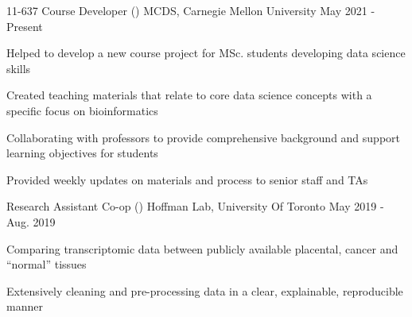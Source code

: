 \begin{cventries}
    \cventry
    {11-637 Course Developer ()}
      {MCDS, Carnegie Mellon University}
      {May 2021 - Present}
      {}%
      {
        \begin{cvitems}
        \item {Helped to develop a new course project for MSc. students developing data science skills}
        \item {Created teaching materials that relate to core data science concepts with a specific focus on bioinformatics}
        \item {Collaborating with professors to provide comprehensive background and support learning objectives for students}
        \item {Provided weekly updates on materials and process to senior staff and TAs}
        \end{cvitems}
      }
    \cventry
    {Research Assistant Co-op ()}
      {Hoffman Lab, University Of Toronto}
      {May 2019 - Aug. 2019}
      {}%
      {
        \begin{cvitems}
         \item {Comparing transcriptomic data between publicly available placental, cancer and ``normal'' tissues}
         \item {Extensively cleaning and pre-processing data in a clear, explainable, reproducible manner}

\end{cvitems}}
\end{cventries}
